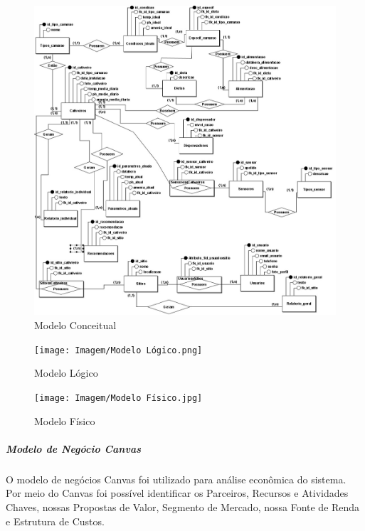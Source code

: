     \begin{figure}[!htb]
    \caption{Modelo Conceitual}%
    \label{fig:conceitual}
    \includegraphics[width = 1\CaptionWidth]{Imagem/Modelo Conceitual.jpeg}
    \end{figure}

    \newpage

    \begin{figure}[!htb]
    \caption{Modelo Lógico}%
    \label{fig:logico}
    \texttt{[image: Imagem/Modelo Lógico.png]}
    \end{figure}

    \newpage

    \begin{figure}[!htb]
    \caption{Modelo Físico}%
    \label{fig:fisico}
    \texttt{[image: Imagem/Modelo Físico.jpg]}
    \end{figure}

\subparagraph*{\textbf{Modelo de Negócio Canvas}}

O modelo de negócios Canvas foi utilizado para análise econômica do sistema. Por meio do Canvas foi possível identificar os Parceiros, Recursos e Atividades Chaves, nossas Propostas de Valor, Segmento de Mercado, nossa Fonte de Renda e Estrutura de Custos.

